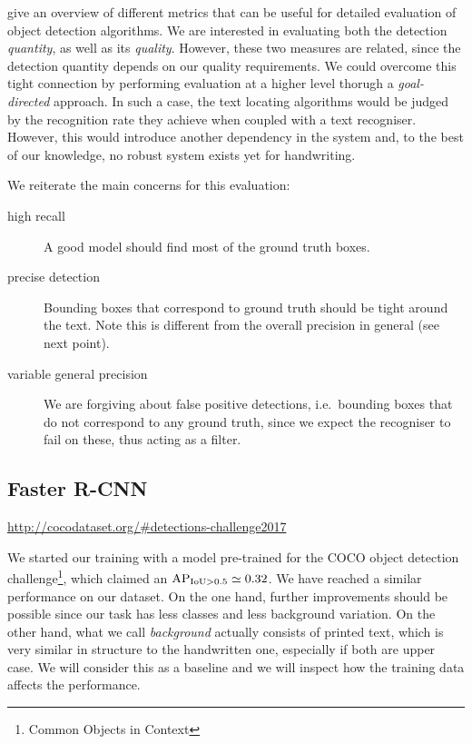 	 give an overview of different metrics that can be useful for detailed evaluation of object detection algorithms. We are interested in evaluating both the detection \emph{quantity}, as well as its \emph{quality}. However, these two measures are related, since the detection quantity depends on our quality requirements. We could overcome this tight connection by performing evaluation at a higher level thorugh a \emph{goal-directed} approach. In such a case, the text locating algorithms would be judged by the recognition rate they achieve when coupled with a text recogniser. However, this would introduce another dependency in the system and, to the best of our knowledge, no robust system exists yet for handwriting.

	We reiterate the main concerns for this evaluation:
	\begin{description}
		\item[high recall] A good model should find most of the ground truth boxes.
		\item[precise detection] Bounding boxes that correspond to ground truth should be tight around the text. Note this is different from the overall precision in general (see next point).
		\item[variable general precision] We are forgiving about false positive detections, i.e.\ bounding boxes that do not correspond to any ground truth, since we expect the recogniser to fail on these, thus acting as a filter.
	\end{description}

	\subsection{Faster R-CNN}\label{sec:frcnn_results}
		\urldef{\cocoURL}\url{http://cocodataset.org/#detections-challenge2017}

		We started our training with a model pre-trained for the COCO object detection challenge\footnote{Common Objects in Context \cocoURL}, which claimed an \(\operatorname{\operatorname{AP}_{\operatorname{IoU} > 0.5}} \simeq 0.32\). We have reached a similar performance on our  dataset. On the one hand, further improvements should be possible since our task has less classes and less background variation. On the other hand, what we call \emph{background} actually consists of printed text, which is very similar in structure to the handwritten one, especially if both are upper case. We will consider this as a baseline and we will inspect how the training data affects the performance.

